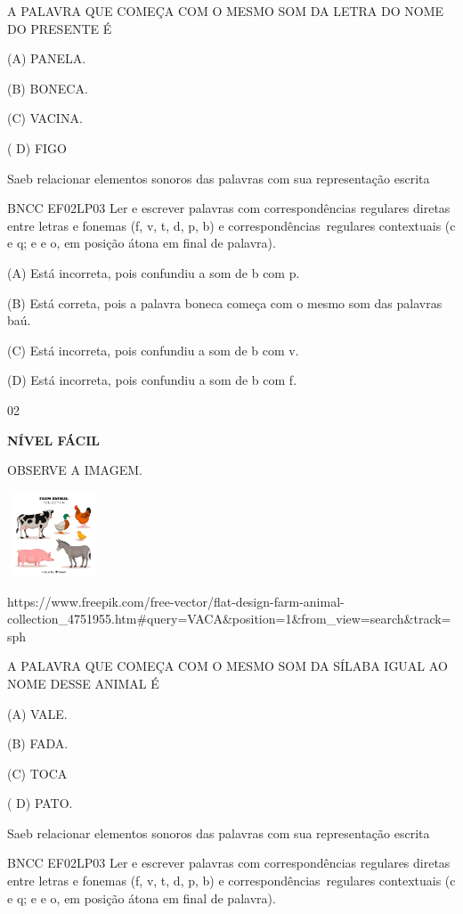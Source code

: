 {{A PALAVRA QUE COMEÇA COM O MESMO SOM DA LETRA DO NOME DO PRESENTE É

(A) PANELA.

(B) BONECA.

(C) VACINA.

( D) FIGO

Saeb relacionar elementos sonoros das palavras com sua representação
escrita

BNCC EF02LP03 Ler e escrever palavras com correspondências regulares
diretas entre letras e fonemas (f, v, t, d, p, b) e
correspondências~regulares contextuais (c e q; e e o, em posição átona
em final de palavra).

(A) Está incorreta, \protect\hypertarget{_Hlk129267612}{}{}pois
confundiu a som de b com p.

(B) Está correta, pois a palavra boneca começa com o mesmo som das
palavras baú.

(C) Está incorreta, pois confundiu a som de b com v.

(D) Está incorreta, pois confundiu a som de b com f.

\num{02}

\textbf{NÍVEL FÁCIL}

OBSERVE A IMAGEM.

\includegraphics[width=1.10000in,height=0.99236in]{media/image148.jpeg}

https://www.freepik.com/free-vector/flat-design-farm-animal-collection\_4751955.htm\#query=VACA\&position=1\&from\_view=search\&track=sph

\protect\hypertarget{_Hlk129501578}{}{}A PALAVRA QUE COMEÇA COM O MESMO
SOM DA SÍLABA IGUAL AO NOME DESSE ANIMAL É

(A) VALE.

(B) FADA.

(C) TOCA

( D) PATO.

Saeb relacionar elementos sonoros das palavras com sua representação
escrita

BNCC EF02LP03 Ler e escrever palavras com correspondências regulares
diretas entre letras e fonemas (f, v, t, d, p, b) e
correspondências~regulares contextuais (c e q; e e o, em posição átona
em final de palavra).

}}
